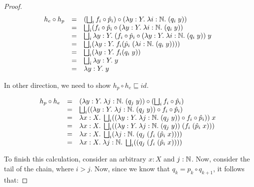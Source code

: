 \begin{proof}
\begin{displaymath}
  \begin{array}{lcl}
    h_e \circ h_p  
     & = & 
      (\bigsqcup_i f_i \circ \hat{p}_i) \circ (\lambda y:Y.\; \lambda i:\mathbb{N}.\; (q_i\; y)) 
\\
      & = & 
      \bigsqcup_i (f_i \circ \hat{p}_i \circ (\lambda y:Y.\; \lambda i:\mathbb{N}.\; (q_i\; y)) 
\\      
      & = & 
      \bigsqcup_i \lambda y:Y.\;(f_i \circ \hat{p}_i \circ (\lambda y:Y.\; \lambda i:\mathbb{N}.\; (q_i\; y))\;y 
\\
      & = & 
      \bigsqcup_i (\lambda y:Y.\;f_i(\hat{p}_i\;(\lambda i:\mathbb{N}.\; (q_i\; y))))
\\
      & = & 
      \bigsqcup_i (\lambda y:Y.\;f_i(q_i\; y))
\\
      & = & 
      \bigsqcup_i \lambda y:Y.\;y
\\
      & = & 
      \lambda y:Y.\;y
\\
  \end{array}
\end{displaymath}

In other direction, we need to show $h_p \circ h_e \sqsubseteq id$.

\begin{displaymath}
  \begin{array}{lcl}
    h_p \circ h_e
     & = &  
      (\lambda y:Y.\; \lambda j:\mathbb{N}.\; (q_j\; y)) \circ (\bigsqcup_i f_i \circ \hat{p}_i)
\\
     & = &  
      \bigsqcup_i ((\lambda y:Y.\; \lambda j:\mathbb{N}.\; (q_j\; y)) \circ f_i \circ \hat{p}_i)
\\
     & = &  
      \lambda x:X.\; \bigsqcup_i ((\lambda y:Y.\; \lambda j:\mathbb{N}.\; (q_j\; y)) \circ f_i \circ \hat{p}_i))\;x
\\
     & = &  
      \lambda x:X.\; \bigsqcup_i ((\lambda y:Y.\; \lambda j:\mathbb{N}.\; (q_j\; y))\;(f_i\;(\hat{p}_i\;x)))
\\   
     & = &  
      \lambda x:X.\; \bigsqcup_i (\lambda j:\mathbb{N}.\; (q_j\; (f_i\;(\hat{p}_i\;x))))
\\   
     & = &  
      \lambda x:X.\; \lambda j:\mathbb{N}.\; \bigsqcup_i ((q_j\; (f_i\;(\hat{p}_i\;x))))
  \end{array}
\end{displaymath}

To finish this calculation, consider an arbitrary $x:X$ and $j:\mathbb{N}$. Now, consider
the tail of the chain, where $i > j$. Now, since we know that $q_k = p_k \circ q_{k+1}$, 
it follows that:


\end{proof}
